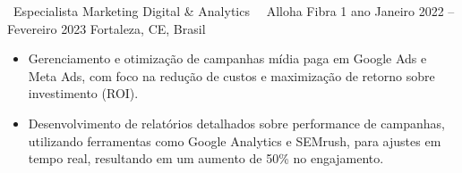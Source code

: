 \divider
\cvevent
{\faDiagnoses\ Especialista Marketing Digital \& Analytics\ \hfill \faAddressCard}
{\faQuinscape\ Alloha Fibra \hfill 1 ano}
{Janeiro 2022 -- Fevereiro 2023}
{Fortaleza, CE, Brasil}
\begin{itemize}[leftmargin=*,itemsep=0.5em,topsep=0.5em]
	\item Gerenciamento e otimização de campanhas mídia paga em Google Ads e
	Meta Ads, com foco na redução de custos e maximização de retorno sobre
	investimento (ROI).
	\item Desenvolvimento de relatórios detalhados sobre performance de campanhas, utilizando ferramentas como Google Analytics e SEMrush, para ajustes em tempo real, resultando em um aumento de 50\% no engajamento.
\end{itemize}
